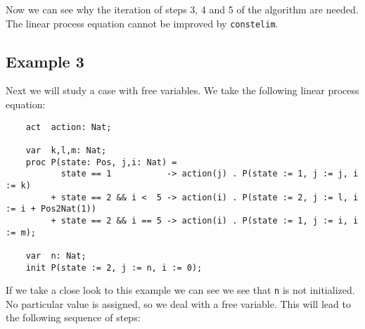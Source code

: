 \documentclass[a4paper,9pt]{article}
\begin{document}
Now we can see why the iteration of steps 3, 4 and 5 of the algorithm are needed. The linear process equation cannot be improved by \verb"constelim".

\subsection{Example 3} 
Next we will study a case with free variables. We take the following linear process equation:
\begin{verbatim}
    act  action: Nat;

    var  k,l,m: Nat;
    proc P(state: Pos, j,i: Nat) =
           state == 1           -> action(j) . P(state := 1, j := j, i := k)
         + state == 2 && i <  5 -> action(i) . P(state := 2, j := l, i := i + Pos2Nat(1))
         + state == 2 && i == 5 -> action(i) . P(state := 1, j := i, i := m);

    var  n: Nat;
    init P(state := 2, j := n, i := 0);
\end{verbatim}
If we take a close look to this example we can see we see that \verb"n" is not initialized. No particular value is assigned, so we deal with a free variable. \newline
This will lead to the following sequence of steps:\\
\end{document}
